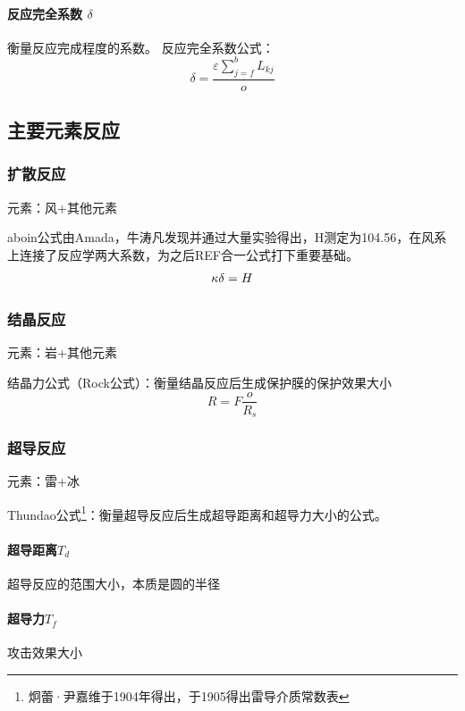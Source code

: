 \documentclass[12pt,a4paper]{article}%
\begin{document}
\paragraph*{反应完全系数 $\delta $ } 衡量反应完成程度的系数。
反应完全系数公式：
\begin{equation}
	\delta =  \frac{\varepsilon \sum_{j=f}^{b}L_{kj}}{o} \tag{其中k为任意元素}
\end{equation}

\subsection{主要元素反应}
\subsubsection{扩散反应}
元素：风+其他元素\\
\par aboin公式由Amada，牛涛凡发现并通过大量实验得出，H测定为104.56，在风系上连接了反应学两大系数，为之后REF合一公式打下重要基础。
\begin{equation}
\kappa \delta =H \notag
\end{equation}

\subsubsection{结晶反应}
元素：岩+其他元素\\
\par 结晶力公式（Rock公式）：衡量结晶反应后生成保护膜的保护效果大小
\begin{equation}
	R=F\frac{o}{R_s} \tag{$R_s$表示岩指数}
\end{equation}


\subsubsection{超导反应}
元素：雷+冰\\
\par Thundao公式\footnote[4]{炯蕾·尹嘉维于1904年得出，于1905得出雷导介质常数表}：衡量超导反应后生成超导距离和超导力大小的公式。
\paragraph{超导距离$T_d$} 超导反应的范围大小，本质是圆的半径
\paragraph{超导力$T_f$} 攻击效果大小
\end{document}

